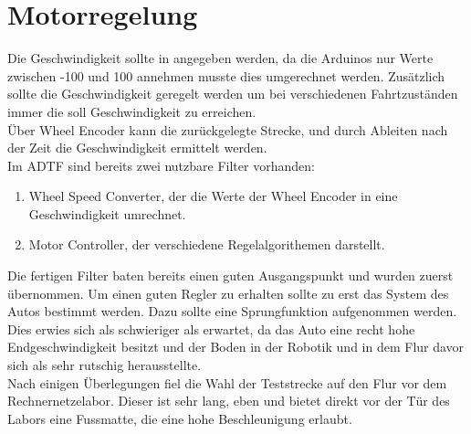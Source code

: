 \documentclass[a4paper,12pt]{report}
\begin{document}

\chapter{Motorregelung}	

	Die Geschwindigkeit sollte in \meter\per\second\usk angegeben werden, da die Arduinos nur Werte zwischen -100 und 100 annehmen musste dies umgerechnet werden. Zusätzlich sollte die Geschwindigkeit geregelt werden um bei verschiedenen Fahrtzuständen immer die soll Geschwindigkeit zu erreichen. \\
	Über Wheel Encoder kann die zurückgelegte Strecke, und durch Ableiten nach der Zeit die Geschwindigkeit ermittelt werden. \\
	Im ADTF sind bereits zwei nutzbare Filter vorhanden: 
	\begin{enumerate}[label=]
		\item Wheel Speed Converter, der die Werte der Wheel Encoder in eine Geschwindigkeit umrechnet. \\
		\item Motor Controller, der verschiedene Regelalgorithemen darstellt.	%
	\end{enumerate}
	Die fertigen Filter baten bereits einen guten Ausgangspunkt und wurden zuerst übernommen. Um einen guten Regler zu erhalten sollte zu erst das System des Autos bestimmt werden. Dazu sollte eine Sprungfunktion aufgenommen werden. Dies erwies sich als schwieriger als erwartet, da das Auto eine recht hohe Endgeschwindigkeit besitzt und der Boden in der Robotik und in dem Flur davor sich als sehr rutschig herausstellte. \\
	Nach einigen Überlegungen fiel die Wahl der Teststrecke auf den Flur vor dem Rechnernetzelabor. Dieser ist sehr lang, eben und bietet direkt vor der Tür des Labors eine Fussmatte, die eine hohe Beschleunigung erlaubt. \\
	
\end{document}

